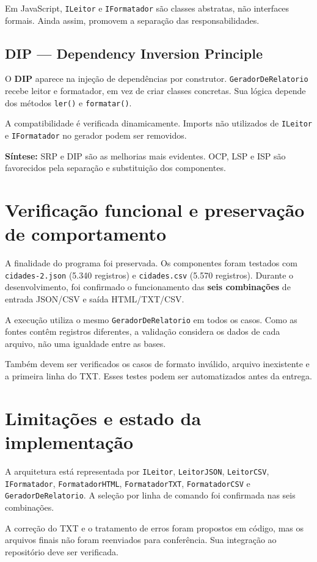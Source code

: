 \documentclass[12pt,a4paper]{article}
\begin{document}
Em JavaScript, \texttt{ILeitor} e \texttt{IFormatador} são classes abstratas, não interfaces formais. Ainda assim, promovem a separação das responsabilidades.

\subsection{DIP --- Dependency Inversion Principle}
O \textbf{DIP} aparece na injeção de dependências por construtor. \texttt{GeradorDeRelatorio} recebe leitor e formatador, em vez de criar classes concretas. Sua lógica depende dos métodos \texttt{ler()} e \texttt{formatar()}.

A compatibilidade é verificada dinamicamente. Imports não utilizados de \texttt{ILeitor} e \texttt{IFormatador} no gerador podem ser removidos.

\textbf{Síntese:} SRP e DIP são as melhorias mais evidentes. OCP, LSP e ISP são favorecidos pela separação e substituição dos componentes.

\section{Verificação funcional e preservação de comportamento}
A finalidade do programa foi preservada. Os componentes foram testados com \texttt{cidades-2.json} (5.340 registros) e \texttt{cidades.csv} (5.570 registros). Durante o desenvolvimento, foi confirmado o funcionamento das \textbf{seis combinações} de entrada JSON/CSV e saída HTML/TXT/CSV.

A execução utiliza o mesmo \texttt{GeradorDeRelatorio} em todos os casos. Como as fontes contêm registros diferentes, a validação considera os dados de cada arquivo, não uma igualdade entre as bases.

Também devem ser verificados os casos de formato inválido, arquivo inexistente e a primeira linha do TXT. Esses testes podem ser automatizados antes da entrega.

\section{Limitações e estado da implementação}
A arquitetura está representada por \texttt{ILeitor}, \texttt{LeitorJSON}, \texttt{LeitorCSV}, \texttt{IFormatador}, \texttt{FormatadorHTML}, \texttt{FormatadorTXT}, \texttt{FormatadorCSV} e \texttt{GeradorDeRelatorio}. A seleção por linha de comando foi confirmada nas seis combinações.

A correção do TXT e o tratamento de erros foram propostos em código, mas os arquivos finais não foram reenviados para conferência. Sua integração ao repositório deve ser verificada.
\end{document}
